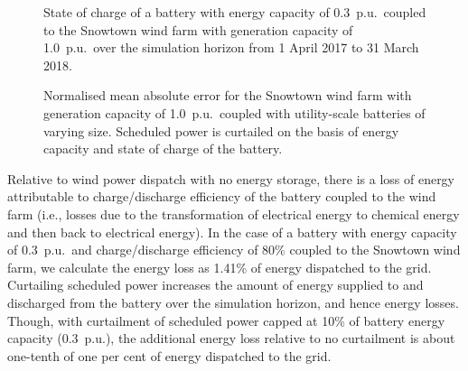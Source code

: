 \documentclass[a4paper, 10pt, twocolumn, preprint, 3p]{elsarticle}
\begin{document}
\begin{figure}[!b]
	\centering
	\scalebox{0.55}{
		
	}
	\caption[State of charge of the battery over the simulation horizon]{State of charge of a battery with energy capacity of 0.3~p.u.\ coupled to the Snowtown wind farm with generation capacity of 1.0~p.u.\ over the simulation horizon from 1 April 2017 to 31 March 2018.} 
	\label{fig:wind_bess_soc}
\end{figure}

\begin{figure*}[!t]
	\centering
	\scalebox{1.0}{
		
	}
	\caption[NMAE of wind power dispatch with battery energy storage when scheduled power is curtailed]{Normalised mean absolute error for the Snowtown wind farm with generation capacity of 1.0~p.u.\ coupled with utility-scale batteries of varying size.  Scheduled power is curtailed on the basis of energy capacity and state of charge of the battery.} 
	\label{fig:wind_bess_nmae}
\end{figure*}

Relative to wind power dispatch with no energy storage, there is a loss of energy attributable to charge/discharge efficiency of the battery coupled to the wind farm (i.e., losses due to the transformation of electrical energy to chemical energy and then back to electrical energy).  In the case of a battery with energy capacity of 0.3~p.u.\ and charge/discharge efficiency of 80\% coupled to the Snowtown wind farm, we calculate the energy loss as 1.41\% of energy dispatched to the grid.  Curtailing scheduled power increases the amount of energy supplied to and discharged from the battery over the simulation horizon, and hence energy losses.  Though, with curtailment of scheduled power capped at 10\% of battery energy capacity (0.3~p.u.), the additional energy loss relative to no curtailment is about one-tenth of one per cent of energy dispatched to the grid.

\end{document}
